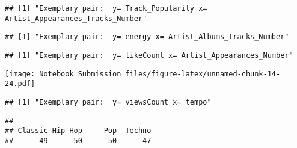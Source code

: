 \documentclass[
]{article}
\newenvironment{Shaded}{\begin{snugshade}}{\end{snugshade}}
\newcommand{\KeywordTok}[1]{\textcolor[rgb]{0.13,0.29,0.53}{\textbf{#1}}}
\newcommand{\NormalTok}[1]{#1}
\newcommand{\OperatorTok}[1]{\textcolor[rgb]{0.81,0.36,0.00}{\textbf{#1}}}
\begin{document}
\begin{verbatim}
## [1] "Exemplary pair:  y= Track_Popularity x= Artist_Appearances_Tracks_Number"
\end{verbatim}

\begin{verbatim}
## [1] "Exemplary pair:  y= energy x= Artist_Albums_Tracks_Number"
\end{verbatim}

\begin{verbatim}
## [1] "Exemplary pair:  y= likeCount x= Artist_Appearances_Number"
\end{verbatim}

\texttt{[image: Notebook\_Submission\_files/figure-latex/unnamed-chunk-14-24.pdf]}

\begin{verbatim}
## [1] "Exemplary pair:  y= viewsCount x= tempo"
\end{verbatim}

\begin{Shaded}
\end{Shaded}

\begin{verbatim}
## 
## Classic Hip Hop     Pop  Techno 
##      49      50      50      47
\end{verbatim}
\end{document}
